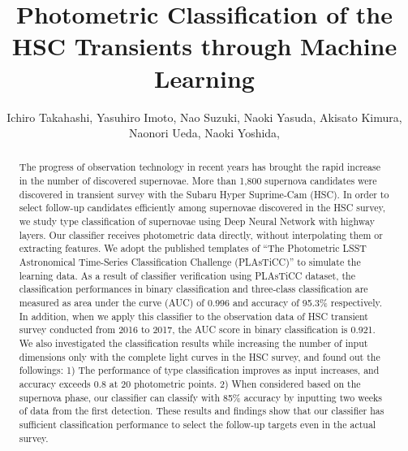 \documentclass[useamsfonts]{pasj01}
\begin{document}
\title{Photometric Classification of the HSC Transients through Machine Learning}
\author{
Ichiro Takahashi,
Yasuhiro Imoto,
Nao Suzuki,
Naoki Yasuda,
Akisato Kimura,
Naonori Ueda,
Naoki Yoshida,
%
}%



\maketitle
%

\begin{abstract}
The progress of observation technology in recent years has brought the rapid increase in the number of discovered supernovae. More than 1,800 supernova candidates were discovered in transient survey with the Subaru Hyper Suprime-Cam (HSC). In order to select follow-up candidates efficiently among supernovae discovered in the HSC survey, we study type classification of supernovae using Deep Neural Network with highway layers. Our classifier receives photometric data directly, without interpolating them or extracting features. We adopt the published templates of “The Photometric LSST Astronomical Time-Series Classification Challenge (PLAsTiCC)” to simulate the learning data. As a result of classifier verification using PLAsTiCC dataset, the classification performances in binary classification and three-class classification are measured as area under the curve (AUC) of 0.996 and accuracy of 95.3\% respectively. In addition, when we apply this classifier to the observation data of HSC transient survey conducted from 2016 to 2017, the AUC score in binary classification is 0.921. We also investigated the classification results while increasing the number of input dimensions only with the complete light curves in the HSC survey, and found out the followings: 1) The performance of type classification improves as input increases, and accuracy exceeds 0.8 at 20 photometric points. 2) When considered based on the supernova phase, our classifier can classify with 85\% accuracy by inputting two weeks of data from the first detection. These results and findings show that our classifier has sufficient classification performance to select the follow-up targets even in the actual survey.
\end{abstract}
\end{document}
